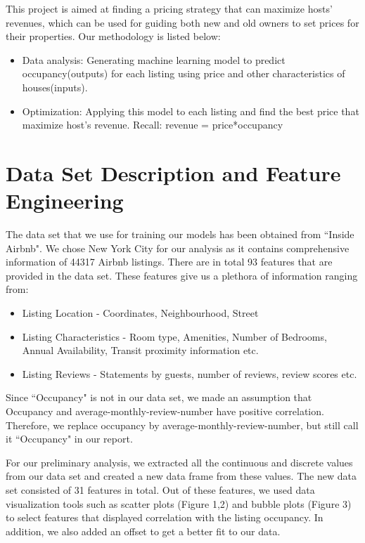 \documentclass[12pt]{article}
\begin{document}
\noindent This project is aimed at finding a pricing strategy that can maximize hosts' revenues, which can be used for guiding both new and old owners to set prices for their properties. Our methodology is listed below:
\begin{itemize}
\item Data analysis: Generating machine learning model to predict occupancy(outputs) for each listing using price and other characteristics of houses(inputs).
\item Optimization: Applying this model to each listing and find the best price that maximize host's revenue. Recall: revenue = price*occupancy
\end{itemize}

\section*{Data Set Description and Feature Engineering}
The data set that we use for training our models has been obtained from ``Inside Airbnb". We chose New York City for our analysis as it contains comprehensive information of  44317 Airbnb listings. There are in total 93 features that are provided in the data set. These features give us a plethora of information ranging from:

\begin{itemize}
\item Listing Location - Coordinates, Neighbourhood, Street
\item Listing Characteristics - Room type, Amenities, Number of Bedrooms, Annual Availability, Transit proximity information etc.
\item Listing Reviews - Statements by guests, number of reviews, review scores etc.

\end{itemize}

\noindent Since ``Occupancy" is not in our data set, we made an assumption that Occupancy  and average-monthly-review-number have positive correlation. Therefore, we replace occupancy by average-monthly-review-number, but still call it ``Occupancy" in our report.  


\noindent For our preliminary analysis, we extracted all the continuous and discrete values from our data set and created a new data frame from these values. The new data set consisted of 31 features in total. Out of these features, we used data visualization tools such as scatter plots (Figure 1,2) and bubble plots (Figure 3) to select features that displayed correlation with the listing occupancy. In addition, we also added an offset to get a better fit to our data.
\end{document}
